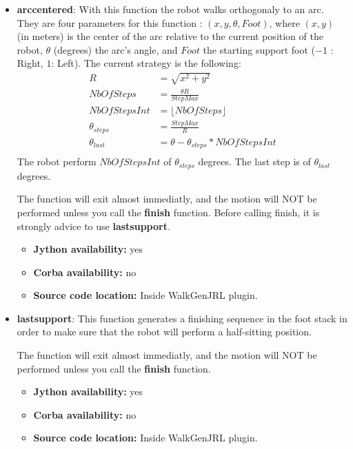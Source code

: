 \begin{itemize}
\item {\bf arccentered}: With this function the robot walks orthogonaly to 
an arc. They are four parameters for this function : $(x,y,\theta,Foot)$,
where $(x,y)$ (in meters) is the center of the arc relative to the current position of the robot,
$\theta$ (degrees) the arc's angle, and $Foot$ the starting support foot ($-1$ : Right, $1$: Left).
The current strategy is the following:
\begin{equation}
\begin{aligned}
R &= \sqrt{x^2+y^2} \\
NbOfSteps &= \frac{\theta R }{StepMax} \\
NbOfStepsInt &= \lfloor NbOfSteps \rfloor \\
\theta_{steps} &= \frac{StepMax}{R} \\
\theta_{last} &= \theta - \theta_{steps} * NbOfStepsInt \\
\end{aligned}
\end{equation}
The robot perform $NbOfStepsInt$ of $\theta_{steps}$ degrees.
The last step is of $\theta_{last}$ degrees.
\par
The function will exit almost immediatly, and the motion will NOT
be performed unless you call the {\bf finish} function.
Before calling finish, it is strongly advice to use {\bf lastsupport}.

\begin{itemize}
\item \textbf{Jython availability:} yes
\item \textbf{Corba availability:} no
\item \textbf{Source code location:} Inside WalkGenJRL plugin.
\end{itemize}

\item {\bf lastsupport}: This function generates a finishing sequence in the foot stack in order to make sure
 that the robot will perform a half-sitting position.
\par
The function will exit almost immediatly, and the motion will NOT
be performed unless you call the {\bf finish} function.

\begin{itemize}
\item \textbf{Jython availability:} yes
\item \textbf{Corba availability:} no
\item \textbf{Source code location:} Inside WalkGenJRL plugin.
\end{itemize}


\end{itemize}
